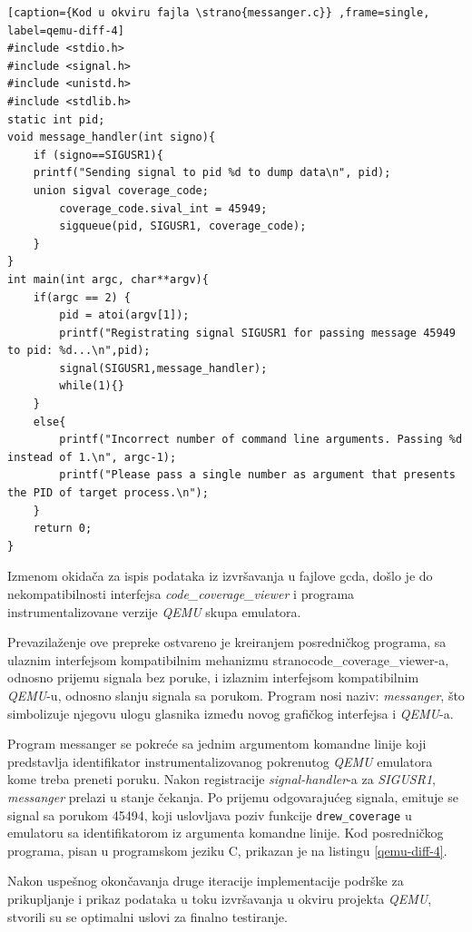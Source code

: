 \documentclass[12pt,oneside]{memoir}
\newcommand{\kod}[1]{\texttt{#1}}
\newcommand{\strano}[1]{\textit{#1}}
\begin{document}
\begin{lstlisting}[caption={Kod u okviru fajla \strano{messanger.c}} ,frame=single, label=qemu-diff-4]
#include <stdio.h>                                                       
#include <signal.h>                                                      
#include <unistd.h>     
#include <stdlib.h>
static int pid;
void message_handler(int signo){
    if (signo==SIGUSR1){
	printf("Sending signal to pid %d to dump data\n", pid);   
	union sigval coverage_code;
        coverage_code.sival_int = 45949;
        sigqueue(pid, SIGUSR1, coverage_code);
    }
}
int main(int argc, char**argv){
	if(argc == 2) {
		pid = atoi(argv[1]);
		printf("Registrating signal SIGUSR1 for passing message 45949 to pid: %d...\n",pid);
		signal(SIGUSR1,message_handler);
		while(1){}
	}
	else{
		printf("Incorrect number of command line arguments. Passing %d instead of 1.\n", argc-1);
		printf("Please pass a single number as argument that presents the PID of target process.\n");
	}
	return 0;
}
\end{lstlisting}


Izmenom okidača za ispis podataka iz izvršavanja u fajlove gcda, došlo je do nekompatibilnosti interfejsa \strano{code\_coverage\_viewer} i programa instrumentalizovane verzije \strano{QEMU} skupa emulatora. 

Prevazilaženje ove prepreke ostvareno je kreiranjem posredničkog programa, sa ulaznim interfejsom kompatibilnim mehanizmu strano{code\_coverage\_viewer}-a, odnosno prijemu signala bez poruke, i izlaznim interfejsom kompatibilnim \strano{QEMU}-u, odnosno slanju signala sa porukom. Program nosi naziv: \strano{messanger}, što simbolizuje njegovu ulogu glasnika između novog grafičkog interfejsa i \strano{QEMU}-a. 

Program messanger se pokreće sa jednim argumentom komandne linije koji predstavlja identifikator instrumentalizovanog pokrenutog \strano{QEMU} emulatora kome treba preneti poruku. Nakon registracije \strano{signal-handler}-a za \strano{SIGUSR1}, \strano{messanger} prelazi u stanje čekanja. Po prijemu odgovarajućeg signala, emituje se signal sa porukom 45494, koji uslovljava poziv funkcije \kod{drew\_coverage} u emulatoru sa identifikatorom iz argumenta komandne linije. Kod posredničkog programa, pisan u programskom jeziku C, prikazan je na listingu \ref{qemu-diff-4}.

Nakon uspešnog okončavanja druge iteracije implementacije podrške za prikupljanje i prikaz podataka u toku izvršavanja u okviru projekta \strano{QEMU}, stvorili su se optimalni uslovi za finalno testiranje. 
\end{document}
